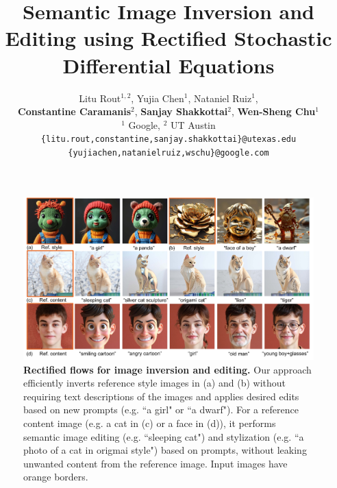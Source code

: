 \documentclass{article} %
\title{Semantic Image Inversion and Editing using Rectified Stochastic Differential Equations}
\author{
Litu Rout$^{1,2}$,\quad
Yujia Chen$^{1}$,\quad
Nataniel Ruiz$^{1}$,\\
\textbf{Constantine Caramanis}$^{2}$,\quad
\textbf{Sanjay Shakkottai}$^{2}$,\quad
\textbf{Wen-Sheng Chu}$^{1}$\\
$^1$ Google, $^2$ UT Austin\\
{\tt\small\{litu.rout,constantine,sanjay.shakkottai\}@utexas.edu}\\
{\tt\small\{yujiachen,natanielruiz,wschu\}@google.com}
}
\theoremstyle{plain}
\begin{document}
\maketitle
\vspace{-7ex}
\begin{figure}[thb]
    \begin{center}
        \includegraphics[width=1\textwidth]{pics/main_low.pdf}
    \end{center}
    \caption{
    \textbf{Rectified flows for image inversion and editing.}
    Our approach efficiently inverts reference style images in (a) and (b) without requiring text descriptions of the images and applies desired edits based on new prompts (e.g. ``a girl" or ``a dwarf").
   For a reference content image (e.g. a cat in (c) or a face in (d)), it performs semantic image editing (e.g. ``sleeping cat") and stylization (e.g. ``a photo of a cat in origmai style") based on prompts, without leaking unwanted content from the reference image. Input images have orange borders.
    }
    \label{fig:main}    
    \vspace{-3ex}    
\end{figure}
\vspace{-1ex}
\end{document}
